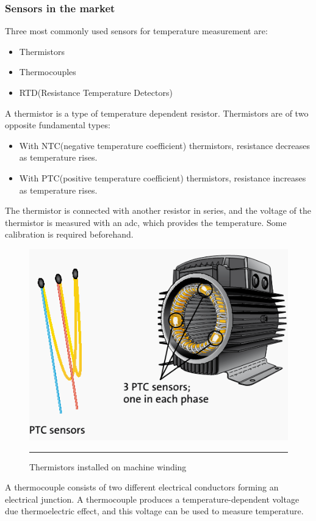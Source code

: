 \subsubsection{Sensors in the market}
Three most commonly used sensors for temperature measurement are:
\begin{itemize}
	\item Thermistors
	\item Thermocouples
	\item RTD(Resistance Temperature Detectors)
\end{itemize}
A thermistor is a type of temperature dependent resistor. 
Thermistors are of two opposite fundamental types:
\begin{itemize}
	\item With NTC(negative temperature coefficient) thermistors, resistance decreases as temperature rises. 
	\item With PTC(positive temperature coefficient) thermistors, resistance increases as temperature rises. 
\end{itemize}
The thermistor is connected with another resistor in series, and the voltage of the thermistor is measured with an adc, which provides the temperature. Some calibration is required beforehand.
\begin{figure}[htbp]
	\centering
		\includegraphics[width = 4.5in]{./Figures/MS/fig330.png}
		\rule{35em}{0.5pt}
	\caption{Thermistors installed on machine winding}
	\label{fig:Thermistors installed on machine winding} 
\end{figure}
A thermocouple consists of two different electrical conductors forming an electrical junction. A thermocouple produces a temperature-dependent voltage due thermoelectric effect, and this voltage can be used to measure temperature.
